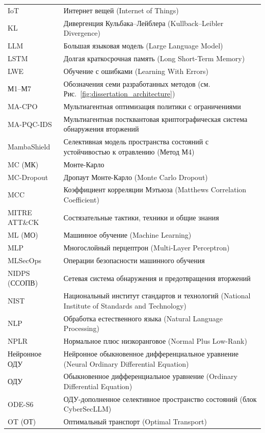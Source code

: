\begin{longtable}{@{}p{3.8cm} p{10cm}@{}}
IoT & Интернет вещей (Internet of Things) \\
KL & Дивергенция Кульбака--Лейблера (Kullback--Leibler Divergence) \\
LLM & Большая языковая модель (Large Language Model) \\
LSTM & Долгая краткосрочная память (Long Short-Term Memory) \\
LWE & Обучение с ошибками (Learning With Errors) \\
М1--М7 & Обозначения семи разработанных методов (см. Рис.~\ref{fig:dissertation_architecture}) \\
MA-CPO & Мультиагентная оптимизация политики с ограничениями \\
MA-PQC-IDS & Мультиагентная постквантовая криптографическая система обнаружения вторжений \\
MambaShield & Селективная модель пространства состояний с устойчивостью к отравлению (Метод М4) \\
MC (МК) & Монте-Карло \\
MC-Dropout & Дропаут Монте-Карло (Monte Carlo Dropout) \\
MCC & Коэффициент корреляции Мэтьюза (Matthews Correlation Coefficient) \\
MITRE ATT\&CK & Состязательные тактики, техники и общие знания \\
ML (МО) & Машинное обучение (Machine Learning) \\
MLP & Многослойный перцептрон (Multi-Layer Perceptron) \\
MLSecOps & Операции безопасности машинного обучения \\
NIDPS (ССОПВ) & Сетевая система обнаружения и предотвращения вторжений \\
NIST & Национальный институт стандартов и технологий (National Institute of Standards and Technology) \\
NLP & Обработка естественного языка (Natural Language Processing) \\
NPLR & Нормальное плюс низкоранговое (Normal Plus Low-Rank) \\
Нейронное ОДУ & Нейронное обыкновенное дифференциальное уравнение (Neural Ordinary Differential Equation) \\
ОДУ & Обыкновенное дифференциальное уравнение (Ordinary Differential Equation) \\
ODE-S6 & ОДУ-дополненное селективное пространство состояний (блок CyberSecLLM) \\
OT (ОТ) & Оптимальный транспорт (Optimal Transport) \\

\end{longtable}
